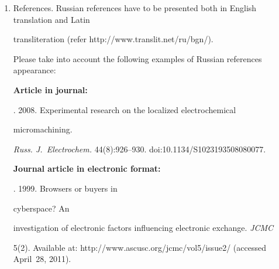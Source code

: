 {\begin{enumerate}[1.]
\begin{itemize}
Important! Keywords must not be sentences; and\\[-12pt]


\item Acknowledgments.\\[-13pt]


\end{itemize}





\item References. Russian references have to be presented both in English translation and Latin


transliteration (refer {\sf http://www.translit.net/ru/bgn/}).





Please take into account the following examples of Russian references appearance:





\noindent


\textbf{Article in journal:}





. 2008. Experimental research on the localized electrochemical


micromachining.


\textit{Russ. J.~Electrochem.}  44(8):926--930. {\sf doi:10.1134/S1023193508080077}.








\noindent


\textbf{Journal article in electronic format:}





. 1999. Browsers or buyers in


cyberspace? An


investigation of electronic factors influencing electronic exchange. \textit{JCMC}


5(2). Available at: {\sf http://www.ascusc.org/jcmc/vol5/issue2/} (accessed April~28, 2011).















\end{enumerate}}
